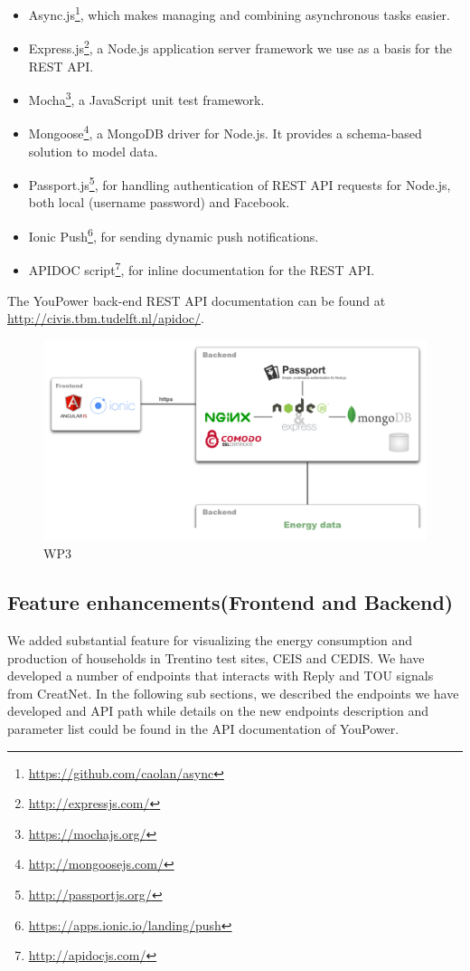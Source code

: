 \begin{itemize}
\item Async.js\footnote{\url{https://github.com/caolan/async}}, which makes managing and combining asynchronous tasks easier. 
\item Express.js\footnote{\url{http://expressjs.com/}}, a Node.js application server framework we use as a basis for the REST API. 
\item Mocha\footnote{\url{https://mochajs.org/}}, a JavaScript unit test framework. 
\item Mongoose\footnote{\url{http://mongoosejs.com/}}, a MongoDB driver for Node.js. It provides a schema-based solution to model data. 
\item Passport.js\footnote{\url{http://passportjs.org/}}, for handling authentication of REST API requests for Node.js, both local (username password) and Facebook. 
\item Ionic Push\footnote{\url{https://apps.ionic.io/landing/push}}, for sending dynamic push notifications. 
\item APIDOC script\footnote{\url{http://apidocjs.com/}}, for inline documentation for the REST API. 
\end{itemize}

The YouPower back-end REST API documentation can be found at {\footnotesize\url{http://civis.tbm.tudelft.nl/apidoc/}}. 
% 


\begin{figure}
\centering
\includegraphics[width=0.9\linewidth]{img/tech}
\caption{WP3}
\label{fig:ScreenShot2015-11-09at18}
\end{figure}
\subsection{Feature enhancements(Frontend and Backend)}
We added substantial feature for visualizing the energy consumption and production of households in Trentino test sites, CEIS and CEDIS. We have developed a number of endpoints that interacts with Reply and  TOU signals from CreatNet. In the following sub sections, we described the endpoints we have developed and API path while details on the new endpoints description and parameter list could be found in the API documentation of YouPower.
